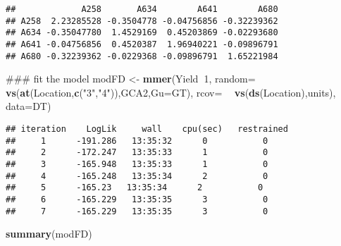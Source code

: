 \documentclass[]{article}
\newenvironment{Shaded}{\begin{snugshade}}{\end{snugshade}}
\newcommand{\KeywordTok}[1]{\textcolor[rgb]{0.13,0.29,0.53}{\textbf{#1}}}
\newcommand{\DataTypeTok}[1]{\textcolor[rgb]{0.13,0.29,0.53}{#1}}
\newcommand{\DecValTok}[1]{\textcolor[rgb]{0.00,0.00,0.81}{#1}}
\newcommand{\StringTok}[1]{\textcolor[rgb]{0.31,0.60,0.02}{#1}}
\newcommand{\OperatorTok}[1]{\textcolor[rgb]{0.81,0.36,0.00}{\textbf{#1}}}
\newcommand{\NormalTok}[1]{#1}
\begin{document}
\begin{verbatim}
##             A258       A634        A641        A680
## A258  2.23285528 -0.3504778 -0.04756856 -0.32239362
## A634 -0.35047780  1.4529169  0.45203869 -0.02293680
## A641 -0.04756856  0.4520387  1.96940221 -0.09896791
## A680 -0.32239362 -0.0229368 -0.09896791  1.65221984
\end{verbatim}

\begin{Shaded}
\begin{Highlighting}[]
\NormalTok{### fit the model}
\NormalTok{modFD <-}\StringTok{ }\KeywordTok{mmer}\NormalTok{(Yield}\OperatorTok{~}\DecValTok{1}\NormalTok{, }
              \DataTypeTok{random=}\OperatorTok{~}\StringTok{ }\KeywordTok{vs}\NormalTok{(}\KeywordTok{at}\NormalTok{(Location,}\KeywordTok{c}\NormalTok{(}\StringTok{"3"}\NormalTok{,}\StringTok{"4"}\NormalTok{)),GCA2,}\DataTypeTok{Gu=}\NormalTok{GT), }
              \DataTypeTok{rcov=} \OperatorTok{~}\StringTok{ }\KeywordTok{vs}\NormalTok{(}\KeywordTok{ds}\NormalTok{(Location),units),}
              \DataTypeTok{data=}\NormalTok{DT)}
\end{Highlighting}
\end{Shaded}

\begin{verbatim}
## iteration    LogLik     wall    cpu(sec)   restrained
##     1      -191.286   13:35:32      0           0
##     2      -172.247   13:35:33      1           0
##     3      -165.948   13:35:33      1           0
##     4      -165.248   13:35:34      2           0
##     5      -165.23   13:35:34      2           0
##     6      -165.229   13:35:35      3           0
##     7      -165.229   13:35:35      3           0
\end{verbatim}

\begin{Shaded}
\begin{Highlighting}[]
\KeywordTok{summary}\NormalTok{(modFD)}
\end{Highlighting}
\end{Shaded}
\end{document}
